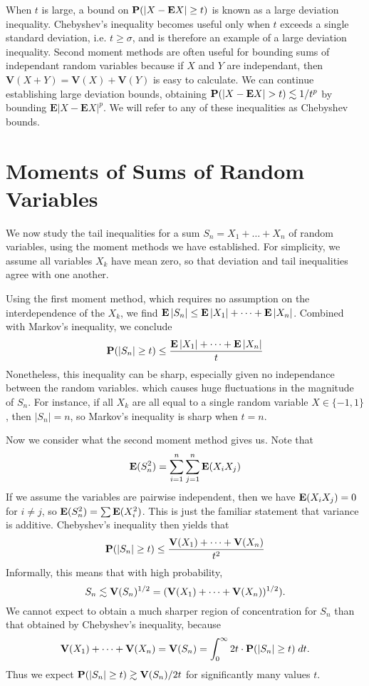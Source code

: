 When $t$ is large, a bound on $\operatorname{\mathbf{P}}(|X - \mathbf{E}X| \geq t)$ is known as a large deviation inequality. Chebyshev's inequality becomes useful only when $t$ exceeds a single standard deviation, i.e. $t \geq \sigma$, and is therefore an example of a large deviation inequality. Second moment methods are often useful for bounding sums of independant random variables because if $X$ and $Y$ are independant, then $\mathbf{V}(X + Y) = \mathbf{V}(X) + \mathbf{V}(Y)$ is easy to calculate. We can continue establishing large deviation bounds, obtaining $\operatorname{\mathbf{P}}(|X - \mathbf{E} X| > t) \lesssim 1/t^p$ by bounding $\mathbf{E}|X - \mathbf{E}X|^p$. We will refer to any of these inequalities as Chebyshev bounds.

\section{Moments of Sums of Random Variables}

We now study the tail inequalities for a sum $S_n = X_1 + \dots + X_n$ of random variables, using the moment methods we have established. For simplicity, we assume all variables $X_k$ have mean zero, so that deviation and tail inequalities agree with one another.

Using the first moment method, which requires no assumption on the interdependence of the $X_k$, we find $\operatorname{\mathbf{E}} |S_n| \leq \operatorname{\mathbf{E}} |X_1| + \dots + \operatorname{\mathbf{E}} |X_n|$. Combined with Markov's inequality, we conclude
%
\[ \mathbf{P}(|S_n| \geq t) \leq \frac{\operatorname{\mathbf{E}} |X_1| + \dots + \operatorname{\mathbf{E}} |X_n|}{t} \]
%
Nonetheless, this inequality can be sharp, especially given no independance between the random variables. which causes huge fluctuations in the magnitude of $S_n$. For instance, if all $X_k$ are all equal to a single random variable $X \in \{ -1, 1 \}$, then $|S_n| = n$, so Markov's inequality is sharp when $t = n$.

Now we consider what the second moment method gives us. Note that
%
\[ \operatorname{\mathbf{E}}(S_n^2) = \sum_{i = 1}^n \sum_{j = 1}^n \operatorname{\mathbf{E}}(X_i X_j) \]
%
If we assume the variables are pairwise independent, then we have $\operatorname{\mathbf{E}}(X_i X_j) = 0$ for $i \neq j$, so $\operatorname{\mathbf{E}}(S_n^2) = \sum \operatorname{\mathbf{E}}(X_i^2)$. This is just the familiar statement that variance is additive. Chebyshev's inequality then yields that
%
\[ \mathbf{P}(|S_n| \geq t) \leq \frac{\operatorname{\mathbf{V}}(X_1) + \dots + \operatorname{\mathbf{V}}(X_n)}{t^2} \]
%
Informally, this means that with high probability,
%
\[ S_n \lesssim \operatorname{\mathbf{V}}(S_n)^{1/2} = (\operatorname{\mathbf{V}}(X_1) + \dots + \operatorname{\mathbf{V}}(X_n))^{1/2}). \]
%
We cannot expect to obtain a much sharper region of concentration for $S_n$ than that obtained by Chebyshev's inequality, because
%
\[ \operatorname{\mathbf{V}}(X_1) + \dots + \operatorname{\mathbf{V}}(X_n) = \operatorname{\mathbf{V}}(S_n) = \int_0^\infty 2t \cdot \mathbf{P}(|S_n| \geq t)\; dt. \]
%
Thus we expect $\mathbf{P}(|S_n| \geq t) \gtrsim \operatorname{\mathbf{V}}(S_n) / 2t$ for significantly many values $t$.


